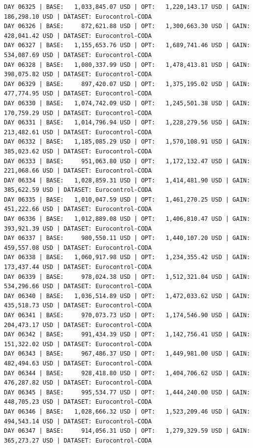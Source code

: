 \documentclass[11pt,a4paper]{article}
\begin{document}
\begin{verbatim}
DAY 06325 | BASE:   1,033,845.07 USD | OPT:   1,220,143.17 USD | GAIN: 186,298.10 USD | DATASET: Eurocontrol-CODA
DAY 06326 | BASE:     872,621.88 USD | OPT:   1,300,663.30 USD | GAIN: 428,041.42 USD | DATASET: Eurocontrol-CODA
DAY 06327 | BASE:   1,155,653.76 USD | OPT:   1,689,741.46 USD | GAIN: 534,087.69 USD | DATASET: Eurocontrol-CODA
DAY 06328 | BASE:   1,080,337.99 USD | OPT:   1,478,413.81 USD | GAIN: 398,075.82 USD | DATASET: Eurocontrol-CODA
DAY 06329 | BASE:     897,420.07 USD | OPT:   1,375,195.02 USD | GAIN: 477,774.95 USD | DATASET: Eurocontrol-CODA
DAY 06330 | BASE:   1,074,742.09 USD | OPT:   1,245,501.38 USD | GAIN: 170,759.29 USD | DATASET: Eurocontrol-CODA
DAY 06331 | BASE:   1,014,796.94 USD | OPT:   1,228,279.56 USD | GAIN: 213,482.61 USD | DATASET: Eurocontrol-CODA
DAY 06332 | BASE:   1,185,085.29 USD | OPT:   1,570,108.91 USD | GAIN: 385,023.62 USD | DATASET: Eurocontrol-CODA
DAY 06333 | BASE:     951,063.80 USD | OPT:   1,172,132.47 USD | GAIN: 221,068.66 USD | DATASET: Eurocontrol-CODA
DAY 06334 | BASE:   1,028,859.31 USD | OPT:   1,414,481.90 USD | GAIN: 385,622.59 USD | DATASET: Eurocontrol-CODA
DAY 06335 | BASE:   1,010,047.59 USD | OPT:   1,461,270.25 USD | GAIN: 451,222.66 USD | DATASET: Eurocontrol-CODA
DAY 06336 | BASE:   1,012,889.08 USD | OPT:   1,406,810.47 USD | GAIN: 393,921.39 USD | DATASET: Eurocontrol-CODA
DAY 06337 | BASE:     980,550.11 USD | OPT:   1,440,107.20 USD | GAIN: 459,557.08 USD | DATASET: Eurocontrol-CODA
DAY 06338 | BASE:   1,060,917.98 USD | OPT:   1,234,355.42 USD | GAIN: 173,437.44 USD | DATASET: Eurocontrol-CODA
DAY 06339 | BASE:     978,024.38 USD | OPT:   1,512,321.04 USD | GAIN: 534,296.66 USD | DATASET: Eurocontrol-CODA
DAY 06340 | BASE:   1,036,514.89 USD | OPT:   1,472,033.62 USD | GAIN: 435,518.73 USD | DATASET: Eurocontrol-CODA
DAY 06341 | BASE:     970,073.73 USD | OPT:   1,174,546.90 USD | GAIN: 204,473.17 USD | DATASET: Eurocontrol-CODA
DAY 06342 | BASE:     991,434.39 USD | OPT:   1,142,756.41 USD | GAIN: 151,322.02 USD | DATASET: Eurocontrol-CODA
DAY 06343 | BASE:     967,486.37 USD | OPT:   1,449,981.00 USD | GAIN: 482,494.63 USD | DATASET: Eurocontrol-CODA
DAY 06344 | BASE:     928,418.80 USD | OPT:   1,404,706.62 USD | GAIN: 476,287.82 USD | DATASET: Eurocontrol-CODA
DAY 06345 | BASE:     995,534.77 USD | OPT:   1,444,240.00 USD | GAIN: 448,705.23 USD | DATASET: Eurocontrol-CODA
DAY 06346 | BASE:   1,028,666.32 USD | OPT:   1,523,209.46 USD | GAIN: 494,543.14 USD | DATASET: Eurocontrol-CODA
DAY 06347 | BASE:     914,056.31 USD | OPT:   1,279,329.59 USD | GAIN: 365,273.27 USD | DATASET: Eurocontrol-CODA

\end{verbatim}
\end{document}
